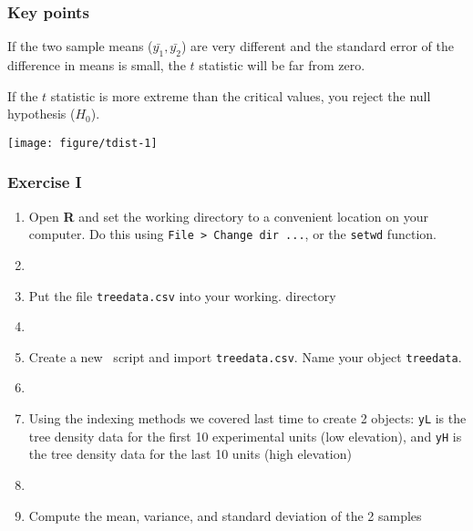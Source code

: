 \documentclass[color=usenames,dvipsnames]{beamer}\usepackage[]{graphicx}\usepackage[]{color}
\newcommand{\inr}[1]{\colorbox{inlinecolor}{\texttt{#1}}}
\begin{document}
\begin{frame}[fragile]
  \frametitle{Key points}

\small
If the two sample means ($\bar{y_1}, \bar{y_2}$) are very
different and the standard error of the difference in means is
small, the $t$ statistic will be far from zero. \\
\pause
\vfill

If the $t$ statistic is more extreme than the critical
    values, you reject the null hypothesis ($H_0$). \\
\pause
    \vfill

    \centering
  \texttt{[image: figure/tdist-1]} \\
\end{frame}






\begin{frame}[fragile]
  \frametitle{Exercise I}
  \begin{enumerate}[\bf (1)]
    \item<1-> Open {\bf R} and set the working directory to a convenient
      location on your computer. Do this using {\tt File > Change dir ...}, or the \inr{setwd} function.
    \item[]
    \item<2-> Put the file {\tt treedata.csv} into your working.
      directory
    \item[]
    \item<3-> Create a new \R~script and import {\tt treedata.csv}. Name your object {\tt treedata}.
    \item[]
    \item<4-> Using the indexing methods we covered last time to
      create 2 objects: \inr{yL} is the tree density data for the
      first 10 experimental units (low elevation), and \inr{yH} is
      the tree density data for the last 10 units (high elevation)
    \item[]
    \item<5-> Compute the mean, variance, and standard deviation of the 2 samples
  \end{enumerate}
\end{frame}
\end{document}

